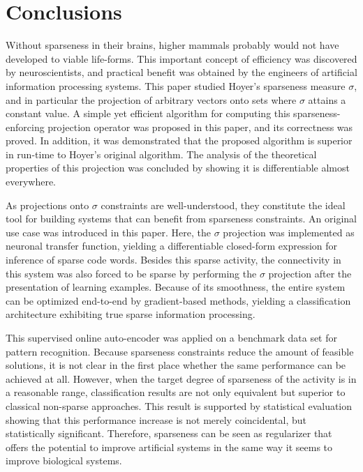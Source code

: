 \documentclass[twoside,11pt]{article}
\newcommand{\0}{\mathcal{O}}
\begin{document}
\section{Conclusions}
Without sparseness in their brains, higher mammals probably would not have developed to viable life-forms.
This important concept of efficiency was discovered by neuroscientists, and practical benefit was obtained by the engineers of artificial information processing systems.
This paper studied Hoyer's sparseness measure $\sigma$, and in particular the projection of arbitrary vectors onto sets where $\sigma$ attains a constant value.
A simple yet efficient algorithm for computing this sparseness-enforcing projection operator was proposed in this paper, and its correctness was proved.
In addition, it was demonstrated that the proposed algorithm is superior in run-time to Hoyer's original algorithm.
The analysis of the theoretical properties of this projection was concluded by showing it is differentiable almost everywhere.

As projections onto $\sigma$ constraints are well-understood, they constitute the ideal tool for building systems that can benefit from sparseness constraints.
An original use case was introduced in this paper.
Here, the $\sigma$ projection was implemented as neuronal transfer function, yielding a differentiable closed-form expression for inference of sparse code words.
Besides this sparse activity, the connectivity in this system was also forced to be sparse by performing the $\sigma$ projection after the presentation of learning examples.
Because of its smoothness, the entire system can be optimized end-to-end by gradient-based methods, yielding a classification architecture exhibiting true sparse information processing.

This supervised online auto-encoder was applied on a benchmark data set for pattern recognition.
Because sparseness constraints reduce the amount of feasible solutions, it is not clear in the first place whether the same performance can be achieved at all.
However, when the target degree of sparseness of the activity is in a reasonable range, classification results are not only equivalent but superior to classical non-sparse approaches.
This result is supported by statistical evaluation showing that this performance increase is not merely coincidental, but statistically significant.
Therefore, sparseness can be seen as regularizer that offers the potential to improve artificial systems in the same way it seems to improve biological systems.
\end{document}

